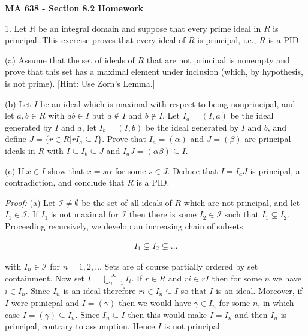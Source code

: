\documentclass[11pt]{article}
\def\noin{\noindent}
\begin{document}
\thispagestyle{empty}
%
%


\large
\noin \textbf{MA 638 - Section 8.2 Homework}\\


\normalsize

1. Let $R$ be  an  integral  domain  and  suppose  that  every  prime  ideal  in $R$ is  principal.   This  exercise proves that every ideal of $R$ is principal, i.e., $R$ is a PID.

(a)  Assume that the set of ideals of $R$ that are not principal is nonempty and prove that this set has a maximal element under inclusion (which, by hypothesis, is not prime).  [Hint:  Use Zorn's Lemma.] 

(b)  Let $I$ be an ideal which is maximal with respect to being nonprincipal, and let $a,b\in R$ with $ab \in I$ but $a\not\in I$ and $b\not\in I$.  Let $I_a = (I,a)$ be the ideal generated by $I$ and $a$, let $I_b= (I,b)$ be the ideal generated by $I$ and $b$, and define $J=\{r \in R|rI_a \subseteq I\}$.  Prove that $I_a= (\alpha )$ and $J= (\beta)$ are principal ideals in $R$ with $I\subseteq I_b \subseteq J$ and $I_aJ= (\alpha\beta)\subseteq I$.

(c)  If $x\in I$ show that $x=s\alpha$ for some $s\in J$.  Deduce that $I=I_aJ$ is principal, a contradiction, and conclude that $R$ is a PID.

{\it Proof:} (a)  Let $\mathscr I\ne \emptyset$ be the set of all ideals of $R$ which are not principal, and let $I_1\in \mathscr I$.  If $I_1$ is not maximal for $\mathscr I$ then there is some $I_2\in\mathscr I$ such that $I_1\subsetneq I_2$.  Proceeding recursively, we develop an increasing chain of subsets 

\begin{align*}
    I_1\subsetneq I_2 \subsetneq \dots 
\end{align*}

with $I_n\in \mathscr I$ for $n=1,2,\dots $  Sets are of course partially ordered by set containment.  Now set $I=\displaystyle \bigcup_{i=1}^\infty I_i$.  If $r\in R$ and $ri\in rI$ then for some $n$ we have $i\in I_n$.  Since $I_n$ is an ideal therefore $ri\in I_n\subseteq I$ so that $I$ is an ideal.  Moreover, if $I$ were prinicpal and $I=(\gamma)$ then we would have $\gamma\in I_n$ for some $n$, in which case $I=(\gamma)\subseteq I_n$.  Since $I_n\subseteq I$ then this would make $I=I_n$ and then $I_n$ is principal, contrary to assumption.  Hence $I$ is not principal.  
\end{document}
